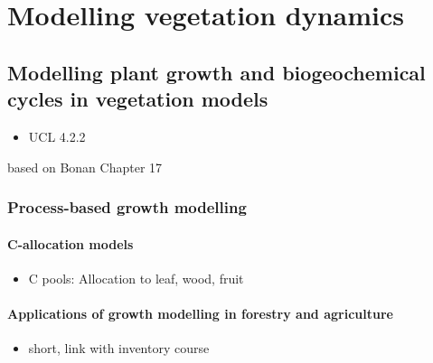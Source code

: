 \documentclass[
  oneside]{book}
\providecommand{\tightlist}{%
  \setlength{\itemsep}{0pt}\setlength{\parskip}{0pt}}
\begin{document}
\hypertarget{part-modelling-vegetation-dynamics}{%
\part{Modelling vegetation dynamics}\label{part-modelling-vegetation-dynamics}}

\hypertarget{modelling-plant-growth-and-biogeochemical-cycles-in-vegetation-models}{%
\chapter{Modelling plant growth and biogeochemical cycles in vegetation models}\label{modelling-plant-growth-and-biogeochemical-cycles-in-vegetation-models}}


\begin{itemize}
\tightlist
\item
  UCL 4.2.2
\end{itemize}

based on Bonan Chapter 17

\hypertarget{process-based-growth-modelling}{%
\section{Process-based growth modelling}\label{process-based-growth-modelling}}

\hypertarget{c-allocation-models}{%
\subsection{C-allocation models}\label{c-allocation-models}}

\begin{itemize}
\tightlist
\item
  C pools: Allocation to leaf, wood, fruit
\end{itemize}

\hypertarget{applications-of-growth-modelling-in-forestry-and-agriculture}{%
\subsection{Applications of growth modelling in forestry and agriculture}\label{applications-of-growth-modelling-in-forestry-and-agriculture}}

\begin{itemize}
\tightlist
\item
  short, link with inventory course
\end{itemize}
\end{document}
